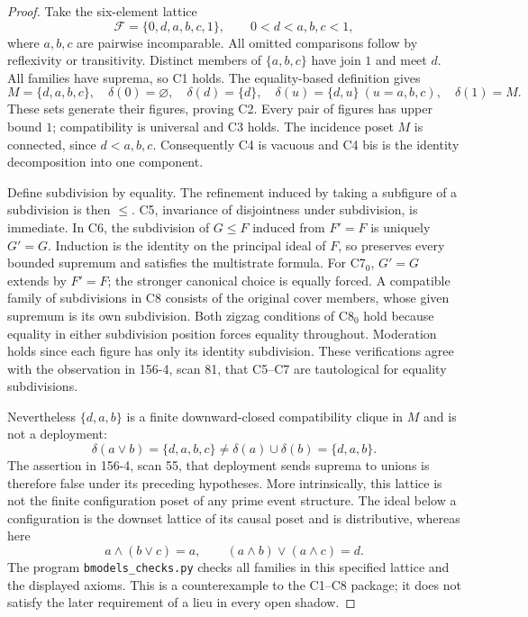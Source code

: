 \begin{proof}
Take the six-element lattice
\[
 \mathcal F=\{0,d,a,b,c,1\},\qquad 0<d<a,b,c<1,
\]
where \(a,b,c\) are pairwise incomparable. All omitted comparisons
follow by reflexivity or transitivity. Distinct members of
\(\{a,b,c\}\) have join \(1\) and meet \(d\). All families have
suprema, so C1 holds. The equality-based definition gives
\[
 M=\{d,a,b,c\},\quad
 \delta(0)=\varnothing,\quad\delta(d)=\{d\},\quad
 \delta(u)=\{d,u\}\ (u=a,b,c),\quad\delta(1)=M.
\]
These sets generate their figures, proving C2. Every pair of figures
has upper bound \(1\); compatibility is universal and C3 holds.
The incidence poset \(M\) is connected, since \(d<a,b,c\).
Consequently C4 is vacuous and C4 bis is the identity decomposition
into one component.

Define subdivision by equality. The refinement induced by taking
a subfigure of a subdivision is then \(\leq\). C5, invariance of
disjointness under subdivision, is immediate. In C6, the subdivision
of \(G\leq F\) induced from \(F'=F\) is uniquely \(G'=G\).
Induction is the identity on the principal ideal of \(F\), so
preserves every bounded supremum and satisfies the multistrate
formula. For C7\(_0\), \(G'=G\) extends by \(F'=F\); the stronger
canonical choice is equally forced. A compatible family of
subdivisions in C8 consists of the original cover members, whose
given supremum is its own subdivision. Both zigzag conditions of
C8\(_0\) hold because equality in either subdivision position
forces equality throughout. Moderation holds since each figure
has only its identity subdivision. These verifications agree
with the observation in 156-4, scan 81, that C5--C7 are
tautological for equality subdivisions.

Nevertheless \(\{d,a,b\}\) is a finite downward-closed compatibility
clique in \(M\) and is not a deployment:
\[
 \delta(a\vee b)=\{d,a,b,c\}
 \ne\delta(a)\cup\delta(b)=\{d,a,b\}.
\]
The assertion in 156-4, scan 55, that deployment sends suprema
to unions is therefore false under its preceding hypotheses.
More intrinsically, this lattice is not the finite configuration
poset of any prime event structure. The ideal below a
configuration is the downset lattice of its causal poset and
is distributive, whereas here
\[
 a\wedge(b\vee c)=a,\qquad
 (a\wedge b)\vee(a\wedge c)=d.
\]
The program \texttt{bmodels\_checks.py} checks all families in
this specified lattice and the displayed axioms. This is a
counterexample to the C1--C8 package; it does not satisfy the
later requirement of a lieu in every open shadow.
\end{proof}

